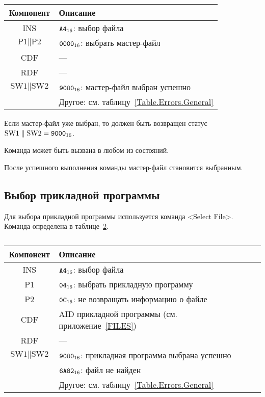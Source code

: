 \begin{table}[hbt]
\caption{}\label{Table.Oper.SelectMFCmd}
\begin{tabular}{|c|p{14cm}|}
\hline
Компонент & Описание \\
\hline
\hline
INS & $\texttt{A4}_{16}$: выбор файла\\ 
\hline
$\text{P1} \parallel \text{P2}$ & $\texttt{0000}_{16}$: выбрать мастер-файл\\
\hline
CDF & --- \\
\hline
\hline 
RDF &  --- \\
\hline
$\text{SW1}\parallel\text{SW2}$ & 
$\texttt{9000}_{16}$: мастер-файл выбран успешно\\
\cline{2-2}
  & Другое: см. таблицу~\ref{Table.Errors.General} \\
\hline
\end{tabular}
\end{table}

Если мастер-файл уже выбран, то должен быть возвращен 
статус $\text{SW1} \parallel \text{SW2} = \texttt{9000}_{16}$.

Команда может быть вызвана в любом из состояний.

После успешного выполнения команды мастер-файл становится выбранным.

\subsection{Выбор прикладной программы}
\label{Oper.Descr.SelectApp}

Для выбора прикладной программы используется команда <Select File>. 
Команда определена в таблице~\ref{Table.Oper.SelectAppCmd}.

\begin{table}[hbt]
\caption{}\label{Table.Oper.SelectAppCmd}
\begin{tabular}{|c|p{14cm}|}
\hline
Компонент & Описание \\
\hline
\hline
INS & $\texttt{A4}_{16}$: выбор файла\\ 
\hline
P1 & $\texttt{04}_{16}$: выбрать прикладную программу\\
\hline
P2 & $\texttt{0C}_{16}$: не возвращать информацию о файле\\
\hline
CDF & AID прикладной программы (см. приложение~\ref{FILES})\\
\hline 
\hline
RDF &  --- \\
\hline
$\text{SW1}\parallel\text{SW2}$ & 
$\texttt{9000}_{16}$: прикладная программа выбрана успешно \\
\cline{2-2}
  & $\texttt{6A82}_{16}$: файл не найден \\
\cline{2-2}
  & Другое: см. таблицу~\ref{Table.Errors.General}\\
\hline
\end{tabular}
\end{table}

